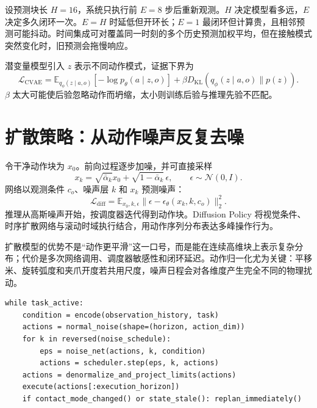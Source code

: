 设预测块长 $H=16$，系统只执行前 $E=8$ 步后重新观测。$H$ 决定模型看多远，$E$ 决定多久闭环一次。$E=H$ 时延低但开环长；$E=1$ 最闭环但计算贵，且相邻预测可能抖动。时间集成可对覆盖同一时刻的多个历史预测加权平均，但在接触模式突然变化时，旧预测会拖慢响应。

潜变量模型引入 $z$ 表示不同动作模式，证据下界为
\begin{equation}
\mathcal L_{\mathrm{CVAE}}
=\mathbb E_{q_\phi(z\mid a,o)}[-\log p_\theta(a\mid z,o)]
+\beta D_{\mathrm{KL}}(q_\phi(z\mid a,o)\|p(z)).
\end{equation}
$\beta$ 太大可能使后验忽略动作而坍缩，太小则训练后验与推理先验不匹配。

\section{扩散策略：从动作噪声反复去噪}

令干净动作块为 $x_0$。前向过程逐步加噪，并可直接采样
\begin{equation}
x_k=\sqrt{\bar\alpha_k}x_0+\sqrt{1-\bar\alpha_k}\,\epsilon,
\qquad \epsilon\sim\mathcal N(0,I).
\label{eq:diffusion-forward}
\end{equation}
网络以观测条件 $c_o$、噪声层 $k$ 和 $x_k$ 预测噪声：
\begin{equation}
\mathcal L_{\mathrm{diff}}=
\mathbb E_{x_0,k,\epsilon}
\|\epsilon-\epsilon_\theta(x_k,k,c_o)\|_2^2.
\label{eq:diffusion-noise-loss}
\end{equation}
推理从高斯噪声开始，按调度器迭代得到动作块。Diffusion Policy 将视觉条件、时序扩散网络与滚动时域执行结合，用动作序列分布表达多峰操作行为\cite{chi2023diffusionpolicy}。

扩散模型的优势不是“动作更平滑”这一口号，而是能在连续高维块上表示复杂分布；代价是多次网络调用、调度器敏感性和闭环延迟。动作归一化尤为关键：平移米、旋转弧度和夹爪开度若共用尺度，噪声日程会对各维度产生完全不同的物理扰动。

\begin{lstlisting}[caption={滚动执行的条件动作扩散教学伪代码}]
while task_active:
    condition = encode(observation_history, task)
    actions = normal_noise(shape=(horizon, action_dim))
    for k in reversed(noise_schedule):
        eps = noise_net(actions, k, condition)
        actions = scheduler.step(eps, k, actions)
    actions = denormalize_and_project_limits(actions)
    execute(actions[:execution_horizon])
    if contact_mode_changed() or state_stale(): replan_immediately()
\end{lstlisting}

